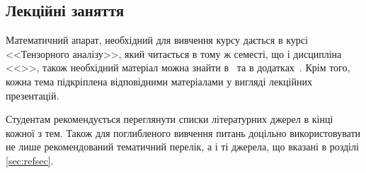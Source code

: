 \documentclass{Syllabus}
\begin{document}
\subsection*{Лекційні заняття}

Математичний апарат, необхідний для вивчення курсу дається в курсі <<Тензорного аналізу>>, який читається в тому ж семесті, що і дисципліна <<\discipline>>, також необхідний матеріал можна знайти в~\cite{ParnovskyElectro} та в додатках~\cite{Ponomarenko}. Крім того, кожна тема підкріплена відповідними матеріалами у вигляді лекційних презентацій.

Студентам рекомендується переглянути списки літературних джерел в кінці кожної з тем. Також для поглибленого вивчення питань доцільно використовувати не лише рекомендований тематичний перелік, а і ті джерела, що вказані в розділі \ref{sec:refsec}.
\end{document}
